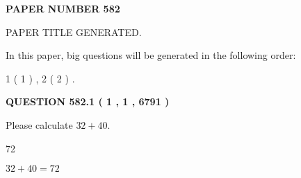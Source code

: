 \documentclass[12pt]{article}
\begin{document}
   
   
   
\newpage 
\setcounter{page}{ 
   582001 } 
   
   
   
   
 {\textbf{ \Large{ PAPER NUMBER  582  }}}
   
   
\vspace{0.2in}
   
   
   
   
   
   
   
   
 \vspace{0.2in}
 
 
 
 
   
   
 PAPER TITLE GENERATED.
   
   
   
\vspace{0.2in}
   
In this paper, big questions will be generated in the following order: 
   
   
   1 ( 1 )
 ,
   2 ( 2 )
 .
  
\vspace{0.2in}
  
{\textbf{\Large{QUESTION
582.1 
 ( 1 , 1 , 6791 )
}}}
  
  
 
Please calculate $ %
32 +  %
40 $.
 
 
 
\noindent{}
 
 

72
 
 
\noindent{}
 
 

 
 
 
\noindent{}
 
 

$ %
32 +  %
40=   %
72$
 
 
\noindent{}
 
 

 
   
   
   
\end{document}
